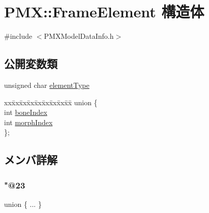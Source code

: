 \hypertarget{struct_p_m_x_1_1_frame_element}{}\section{P\+MX\+:\+:Frame\+Element 構造体}
\label{struct_p_m_x_1_1_frame_element}


{\ttfamily \#include $<$P\+M\+X\+Model\+Data\+Info.\+h$>$}

\subsection*{公開変数類}
\begin{DoxyCompactItemize}
\item 
unsigned char \mbox{\hyperlink{struct_p_m_x_1_1_frame_element_a1bca81797de5a243bb543136cb1877fc}{element\+Type}}
\item 
\begin{tabbing}
xx\=xx\=xx\=xx\=xx\=xx\=xx\=xx\=xx\=\kill
union \{\\
\>int \mbox{\hyperlink{struct_p_m_x_1_1_frame_element_a0ea03fdfa4af252fcf7c1b4d4d290738}{boneIndex}}\\
\>int \mbox{\hyperlink{struct_p_m_x_1_1_frame_element_a8da1a15727dc8e4cbc689ded9c48af88}{morphIndex}}\\
\}; \\

\end{tabbing}\end{DoxyCompactItemize}


\subsection{メンバ詳解}
\mbox{\label{struct_p_m_x_1_1_frame_element_a26c5ab8fd3dbf93223bbefb26c90fa33}} 
\subsubsection{\texorpdfstring{"@23}{@23}}
{\footnotesize\ttfamily union \{ ... \} }

\mbox{\label{struct_p_m_x_1_1_frame_element_a0ea03fdfa4af252fcf7c1b4d4d290738}} 
